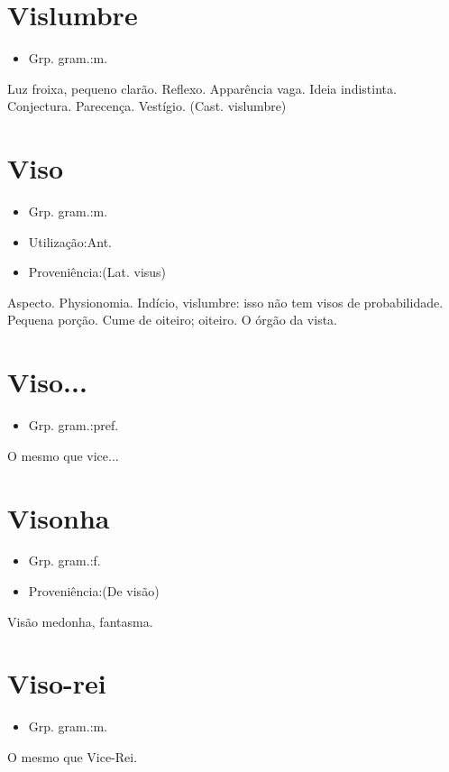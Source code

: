 \documentclass{article}
\begin{document}
\section{Vislumbre}
\begin{itemize}
\item {Grp. gram.:m.}
\end{itemize}
Luz froixa, pequeno clarão.
Reflexo.
Apparência vaga.
Ideia indistinta.
Conjectura.
Parecença.
Vestígio.
(Cast. \textunderscore vislumbre\textunderscore )
\section{Viso}
\begin{itemize}
\item {Grp. gram.:m.}
\end{itemize}
\begin{itemize}
\item {Utilização:Ant.}
\end{itemize}
\begin{itemize}
\item {Proveniência:(Lat. \textunderscore visus\textunderscore )}
\end{itemize}
Aspecto.
Physionomia.
Indício, vislumbre: \textunderscore isso não tem visos de probabilidade\textunderscore .
Pequena porção.
Cume de oiteiro; oiteiro.
O órgão da vista.
\section{Viso...}
\begin{itemize}
\item {Grp. gram.:pref.}
\end{itemize}
O mesmo que \textunderscore vice...\textunderscore 
\section{Visonha}
\begin{itemize}
\item {Grp. gram.:f.}
\end{itemize}
\begin{itemize}
\item {Proveniência:(De \textunderscore visão\textunderscore )}
\end{itemize}
Visão medonha, fantasma.
\section{Viso-rei}
\begin{itemize}
\item {Grp. gram.:m.}
\end{itemize}
O mesmo que \textunderscore Vice-Rei\textunderscore .
\end{document}
